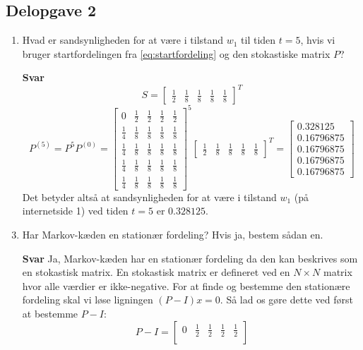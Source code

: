 \documentclass[10pt,a4paper]{article}
\begin{document}
\subsection*{Delopgave 2}
\begin{enumerate}
	\item Hvad er sandsynligheden for at være i tilstand $w_1$ til tiden $t=5$, hvis vi bruger startfordelingen fra \eqref{eq:startfordeling} og den stokastiske matrix $P$?
	\item[\textbf{Svar}] \[ S=\begin{bmatrix}\frac{1}{2} & \frac{1}{8} & \frac{1} {8} & \frac{1} {8} & \frac{1} {8}\end{bmatrix}^T\]
		\[P^{(5)}=P^5P^{(0)}=\begin{bmatrix}
		0 & \frac{1}{2} & \frac{1}{2} & \frac{1}{2} & \frac{1}{2}\\
		\frac{1}{4} & \frac{1}{8} & \frac{1}{8} & \frac{1}{8} & \frac{1}{8}\\
		\frac{1}{4} & \frac{1}{8} & \frac{1}{8} & \frac{1}{8} & \frac{1}{8}\\
		\frac{1}{4} & \frac{1}{8} & \frac{1}{8} & \frac{1}{8} & \frac{1}{8}\\
		\frac{1}{4} & \frac{1}{8} & \frac{1}{8} & \frac{1}{8} & \frac{1}{8}
	\end{bmatrix}^5\begin{bmatrix}\frac{1}{2} & \frac{1}{8} & \frac{1} {8} & \frac{1} {8} & \frac{1} {8}\end{bmatrix}^T=\begin{bmatrix}
		\mathbf{0.328125} \\ 0.16796875 \\ 0.16796875 \\ 0.16796875 \\ 0.16796875
	\end{bmatrix}\]
	Det betyder altså at sandsynligheden for at være i tilstand $w_1$ (på internetside 1) ved tiden $t=5$ er $0.328125$.
	\item Har Markov-kæden en stationær fordeling? Hvis ja, bestem sådan en. 
	\item[\textbf{Svar}] Ja, Markov-kæden har en stationær fordeling da den kan beskrives som en stokastisk matrix. En stokastisk matrix er defineret ved en $N\times N$ matrix hvor alle værdier er ikke-negative. For at finde og bestemme den stationære fordeling skal vi løse ligningen $(P-I)x=0$. Så lad os gøre dette ved først at bestemme $P-I$:
	\[
	P-I=
	\begin{bmatrix}
		0 & \frac{1}{2} & \frac{1}{2} & \frac{1}{2} & \frac{1}{2}\\

\end{bmatrix}\]
\end{enumerate}
\end{document}
